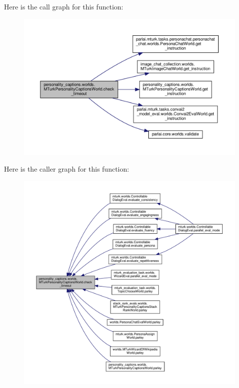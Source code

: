 Here is the call graph for this function\+:
\nopagebreak
\begin{figure}[H]
\begin{center}
\leavevmode
\includegraphics[width=350pt]{classpersonality__captions_1_1worlds_1_1MTurkPersonalityCaptionsWorld_a594560fccee92084ad833d131c77d860_cgraph}
\end{center}
\end{figure}
Here is the caller graph for this function\+:
\nopagebreak
\begin{figure}[H]
\begin{center}
\leavevmode
\includegraphics[width=350pt]{classpersonality__captions_1_1worlds_1_1MTurkPersonalityCaptionsWorld_a594560fccee92084ad833d131c77d860_icgraph}
\end{center}
\end{figure}
\mbox{\label{classpersonality__captions_1_1worlds_1_1MTurkPersonalityCaptionsWorld_a579f1033a02ede69365f79246a23d8da}} 
